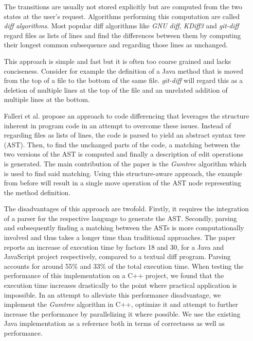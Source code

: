\documentclass[letterpaper]{article}
\begin{document}
The transitions are usually not stored explicitly but are computed from the two states at the user's request.
Algorithms performing this computation are called \emph{diff algorithms}.
Most popular diff algorithms like \emph{GNU diff}, \emph{KDiff3} and \emph{git-diff} regard files as lists of lines and find the differences between them by computing their longest common subsequence and regarding those lines as unchanged.

This approach is simple and fast but it is often too coarse grained and lacks conciseness.
Consider for example the definition of a Java method that is moved from the top of a file to the bottom of the same file.
\emph{git-diff} will regard this as a deletion of multiple lines at the top of the file and an unrelated addition of multiple lines at the bottom.

Falleri et al. \cite{falleri:2014:structure_diff} propose an approach to code differencing that leverages the structure inherent in program code in an attempt to overcome these issues.
Instead of regarding files as lists of lines, the code is parsed to yield an abstract syntax tree (AST).
Then, to find the unchanged parts of the code, a matching between the two versions of the AST is computed and finally a description of edit operations is generated.
The main contribution of the paper is the \emph{Gumtree} algorithm which is used to find said matching.
Using this structure-aware approach, the example from before will result in a single move operation of the AST node representing the method definition.

The disadvantages of this approach are twofold.
Firstly, it requires the integration of a parser for the respective language to generate the AST.
Secondly, parsing and subsequently finding a matching between the ASTs is more computationally involved and thus takes a longer time than traditional approaches.
The paper reports an increase of execution time by factors 18 and 30, for a Java and JavaScript project respectively, compared to a textual diff program.
Parsing accounts for around 55\% and 33\% of the total execution time.
When testing the performance of this implementation on a C++ project, we found that the execution time increases drastically to the point where practical application is impossible.
In an attempt to alleviate this performance disadvantage, we implement the \emph{Gumtree} algorithm in C++, optimize it and attempt to further increase the performance by parallelizing it where possible.
We use the existing Java implementation as a reference both in terms of correctness as well as performance.
\end{document}
